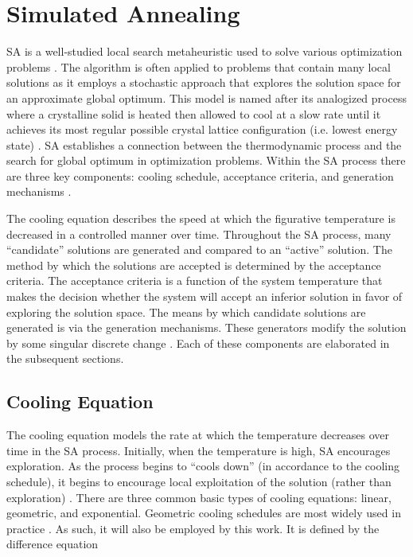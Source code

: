 \documentclass[energies,article,submit,moreauthors]{Definitions/mdpi}
\begin{document}
\section{Simulated Annealing}
\label{sec:sa-simulated-annealing}
SA is a well-studied local search metaheuristic used to solve various optimization problems
\cite{gendreau-2018-handb-metah,press-1992-numer-recip}. The algorithm is often applied to problems that contain many
local solutions as it employs a stochastic approach that explores the solution space for an approximate global optimum.
This model is named after its analogized process where a crystalline solid is heated then allowed to cool at a slow rate
until it achieves its most regular possible crystal lattice configuration (i.e. lowest energy state)
\cite{henderson-1989-theor-pract,press-1992-numer-recip}. SA establishes a connection between the thermodynamic
process and the search for global optimum in optimization problems. Within the SA process there are three key components:
cooling schedule, acceptance criteria, and generation mechanisms
\cite{keller-2019-multi-objec,press-1992-numer-recip}.

The cooling equation describes the speed at which the figurative temperature is decreased in a controlled manner over
time. Throughout the SA process, many ``candidate'' solutions are generated and compared to an ``active'' solution. The
method by which the solutions are accepted is determined by the acceptance criteria. The acceptance criteria is a
function of the system temperature that makes the decision whether the system will accept an inferior solution in favor
of exploring the solution space. The means by which candidate solutions are generated is via the generation mechanisms.
These generators modify the solution by some singular discrete change \cite{gendreau-2018-handb-metah}. Each of these
components are elaborated in the subsequent sections.

\subsection{Cooling Equation}
\label{cooling-equation-experimental}
The cooling equation models the rate at which the temperature decreases over time in the SA process. Initially, when the
temperature is high, SA encourages exploration. As the process begins to ``cools down'' (in accordance to the cooling
schedule), it begins to encourage local exploitation of the solution (rather than exploration)
\cite{rutenbar-1989-simul-anneal-algor,henderson-1989-theor-pract}. There are three common basic types of cooling
equations: linear, geometric, and exponential. Geometric cooling schedules are most widely used in practice
\cite{keller-2019-multi-objec}. As such, it will also be employed by this work. It is defined by the difference
equation
\end{document}
